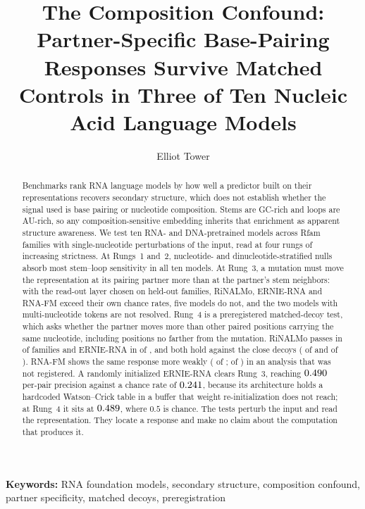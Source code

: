 \documentclass[11pt]{article}
\title{The Composition Confound:\\Partner-Specific Base-Pairing Responses Survive Matched\\Controls in Three of Ten Nucleic Acid Language Models}
\author{Elliot Tower}
\affil{Independent researcher \\ \texttt{elliot@elliottower.ai}}
\date{}
\begin{document}
\maketitle

\noindent\textbf{Keywords:} RNA foundation models, secondary structure, composition confound, partner specificity, matched decoys, preregistration

\begin{abstract}
Benchmarks rank RNA language models by how well a predictor built on their
representations recovers secondary structure, which does not establish whether
the signal used is base pairing or nucleotide composition. Stems are GC-rich
and loops are AU-rich, so any composition-sensitive embedding inherits that
enrichment as apparent structure awareness. We test ten RNA- and DNA-pretrained
models across \panelN{} Rfam families with single-nucleotide perturbations of
the input, read at four rungs of increasing strictness. At Rungs~1 and~2,
nucleotide- and dinucleotide-stratified nulls absorb most stem--loop
sensitivity in all ten models. At Rung~3, a mutation must move the
representation at its pairing partner more than at the partner's stem
neighbors: with the read-out layer chosen on held-out families, RiNALMo,
ERNIE-RNA and RNA-FM exceed their own chance rates, five models do not, and
the two models with multi-nucleotide tokens are not resolved. Rung~4 is a
preregistered matched-decoy test, which asks whether the partner moves more
than other paired positions carrying the same nucleotide, including positions
no farther from the mutation. RiNALMo passes in \decoyAllAboveRiNALMo{} of
\decoyAllFamiliesRiNALMo{} families and ERNIE-RNA in \decoyAllAboveErnieRNA{}
of \decoyAllFamiliesErnieRNA{}, and both hold against the close decoys
(\decoyCloseAboveRiNALMo{} of \decoyCloseFamiliesRiNALMo{} and
\decoyCloseAboveErnieRNA{} of \decoyCloseFamiliesErnieRNA{}). RNA-FM shows the
same response more weakly (\decoyAllAboveRNAFM{} of \decoyAllFamiliesRNAFM{};
\decoyCloseAboveRNAFM{} of \decoyCloseFamiliesRNAFM{}) in an analysis that was
not registered. A randomly initialized ERNIE-RNA clears Rung~3, reaching
$0.490{}$ per-pair precision against a chance rate of
$0.241{}$, because its architecture holds a hardcoded
Watson--Crick table in a buffer that weight re-initialization does not reach;
at Rung~4 it sits at $0.489{}$, where $0.5$ is chance.
The tests perturb the input and read the representation. They locate a
response and make no claim about the computation that produces it.
\end{abstract}
\end{document}
